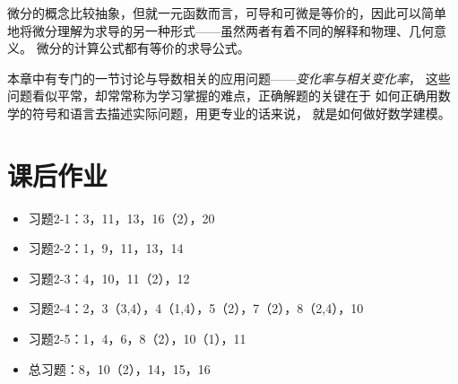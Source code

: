 微分的概念比较抽象，但就一元函数而言，可导和可微是等价的，因此可以简单
地将微分理解为求导的另一种形式——虽然两者有着不同的解释和物理、几何意义。
微分的计算公式都有等价的求导公式。

本章中有专门的一节讨论与导数相关的应用问题——{\it 变化率与相关变化率}，
这些问题看似平常，却常常称为学习掌握的难点，正确解题的关键在于
如何正确用数学的符号和语言去描述实际问题，用更专业的话来说，
就是如何做好数学建模。

\newpage

\section*{课后作业}

\begin{itemize}
  \item 习题2-1：3，11，13，16（2），20
  \item 习题2-2：1，9，11，13，14
  \item 习题2-3：4，10，11（2），12
  \item 习题2-4：2，3（3,4），4（1,4），5（2），7（2），8（2,4），10
  \item 习题2-5：1，4，6，8（2），10（1），11
  \item 总习题：8，10（2），14，15，16
\end{itemize}